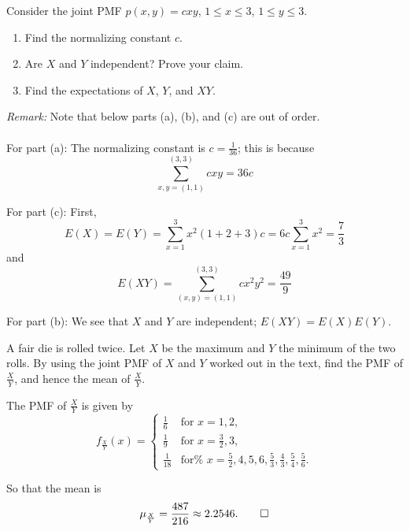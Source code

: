 \begin{problem}[Handout 15, \# 11]
  Consider the joint PMF \(p(x,y)=cxy\), \(1\leq x\leq 3\), \(1\leq y\leq
  3\).
  \begin{enumerate}[label=(\alph*),noitemsep]
  \item Find the normalizing constant \(c\).
  \item Are \(X\) and \(Y\) independent? Prove your claim.
  \item Find the expectations of \(X\), \(Y\), and \(XY\).
  \end{enumerate}
\end{problem}
\begin{solution}
  \emph{Remark:} Note that below parts (a), (b), and (c) are out of order.
  \\\\
  For part (a): The normalizing constant is $c=\frac{1}{36}$; this is
  because
  \[
    \sum_{x,y =(1,1)}^{(3,3)} cxy = 36c
  \]

  For part (c): First,
  \[
    E(X) = E(Y) = \sum_{x=1}^3 x^2(1+2+3)c = 6c \sum_{x=1}^3
    x^2 = \frac{7}{3}
  \]
  and
  \[
    E(XY) = \sum_{(x,y) = (1,1)}^{(3,3)} cx^2y^2 =\frac{49}{9}
  \]

  For part (b): We see that $X$ and $Y$ are independent;
  $E(XY) = E(X)E(Y)$.
\end{solution}

\begin{problem}[Handout 15, \# 12]
  A fair die is rolled twice. Let \(X\) be the maximum and \(Y\) the
  minimum of the two rolls. By using the joint PMF of \(X\) and \(Y\)
  worked out in the text, find the PMF of \(\frac{X}{Y}\), and hence the
  mean of \(\frac{X}{Y}\).
\end{problem}
\begin{solution}
  The PMF of $\frac{X}{Y}$ is given by
  \[
    f_{\frac{X}{Y}}(x)=
    \begin{cases}
      \frac{1}{6}&\text{for \(x=1,2\),} \\
      \frac{1}{9}&\text{for \(x=\frac{3}{2},3\),} \\
      \frac{1}{18}&\text{for%
        \(x=\frac{5}{2},%
        4,5,6,\frac{5}{3},%
        \frac{4}{3},\frac{5}{4},%
        \frac{5}{6}\).}
    \end{cases}
  \]

  So that the mean is
  \[
    \mu_{\frac{X}{Y}} = \frac{487}{216} \approx 2.2546.\qedhere
  \]
\end{solution}

